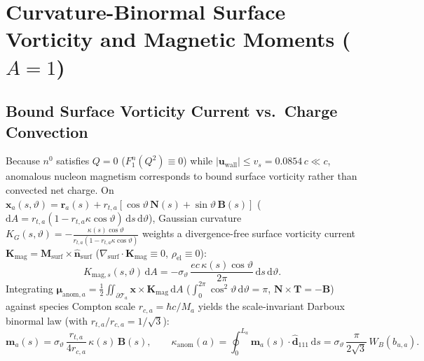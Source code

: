 \documentclass[11pt, a4paper]{article}
\DeclareRobustCommand{\dd}{\mathrm{d}}
\begin{document}
\section{\texorpdfstring{Curvature-Binormal Surface Vorticity and Magnetic Moments ($A = 1$)}{Curvature-Binormal Surface Vorticity and Magnetic Moments (A = 1)}}
\label{sec:magnetic_moments}

\subsection{Bound Surface Vorticity Current vs.\ Charge Convection}
Because $n^0$ satisfies $Q = 0$ ($F_1^n(Q^2) \equiv 0$) while $|\mathbf{u}_{\mathrm{wall}}| \le v_s = 0.0854\,c \ll c$, anomalous nucleon magnetism corresponds to bound surface vorticity rather than convected net charge. On $\mathbf{x}_a(s,\vartheta) = \mathbf{r}_a(s) + r_{t,a}[\cos\vartheta\,\mathbf{N}(s) + \sin\vartheta\,\mathbf{B}(s)]$ ($\dd A = r_{t,a}(1 - r_{t,a}\kappa\cos\vartheta)\,\dd s\,\dd\vartheta$), Gaussian curvature $K_G(s,\vartheta) = -\frac{\kappa(s)\cos\vartheta}{r_{t,a}(1 - r_{t,a}\kappa\cos\vartheta)}$ weights a divergence-free surface vorticity current $\mathbf{K}_{\mathrm{mag}} = \mathbf{M}_{\mathrm{surf}} \times \hat{\mathbf{n}}_{\mathrm{surf}}$ ($\nabla_{\mathrm{surf}}\cdot\mathbf{K}_{\mathrm{mag}} \equiv 0$, $\rho_{\mathrm{el}} \equiv 0$):
\begin{equation}
    K_{\mathrm{mag},s}(s,\vartheta)\,\dd A = -\sigma_\vartheta\,\frac{ec\,\kappa(s)\cos\vartheta}{2\pi}\,\dd s\,\dd\vartheta.
\end{equation}
Integrating $\boldsymbol{\mu}_{\mathrm{anom},a} = \frac{1}{2}\iint_{\partial\mathcal{T}_a} \mathbf{x}\times\mathbf{K}_{\mathrm{mag}}\,\dd A$ ($\int_0^{2\pi}\cos^2\vartheta\,\dd\vartheta = \pi$, $\mathbf{N}\times\mathbf{T} = -\mathbf{B}$) against species Compton scale $r_{c,a} = \hbar c/M_a$ yields the scale-invariant Darboux binormal law (with $r_{t,a}/r_{c,a} = 1/\sqrt{3}$):
\begin{equation}
    \mathbf{m}_a(s) = \sigma_\vartheta\,\frac{r_{t,a}}{4r_{c,a}}\,\kappa(s)\,\mathbf{B}(s), \qquad
    \kappa_{\mathrm{anom}}(a) = \oint_0^{L_a} \mathbf{m}_a(s)\cdot\hat{\mathbf{d}}_{111}\,\dd s = \sigma_\vartheta\,\frac{\pi}{2\sqrt{3}}\,W_B(b_{u,a}).
    \label{eq:darboux_exact_derivation}
\end{equation}
\end{document}

